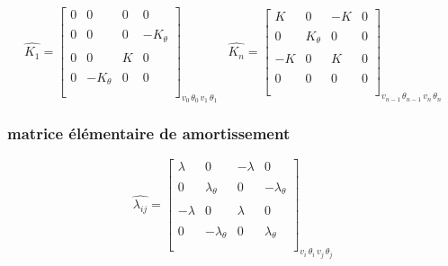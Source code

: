 \documentclass[a4paper,10pt]{report} %
\begin{document}
 \[ \widehat{K_1}=\left[ \begin{array}{cccc}
0 &0& 0&0     \\\\
0&0&0&-K_{\theta} \\\\
0&0& K&0    \\\\
0&-K_{\theta}&0&0   \\\\
 \end{array} \right]_{v_0 \, \theta_0 \, v_1 \, \theta_1 \, }
 \,\,\,\,
 \widehat{K_n}=\left[ \begin{array}{cccc}
K &0& -K&0     \\\\
0&K_{\theta}&0&0 \\\\
-K&0& K&0    \\\\
0&0&0&0   \\\\
 \end{array} \right]_{v_{n-1} \, \theta_{n-1} \, v_{n} \, \theta_{n} \, }\]

\subsubsection{matrice élémentaire de amortissement}
\[ \widehat{\lambda_{ij}}=\left[ \begin{array}{cccc}
\lambda &0& -\lambda&0     \\\\
0& \lambda_{\theta}&0&-\lambda_{\theta} \\\\
-\lambda &0& \lambda&0    \\\\
0&-\lambda_{\theta}&0&\lambda_{\theta}    \\\\
 \end{array} \right]_{v_i \, \theta_i \, v_j \, \theta_j \, }\]
\end{document}
